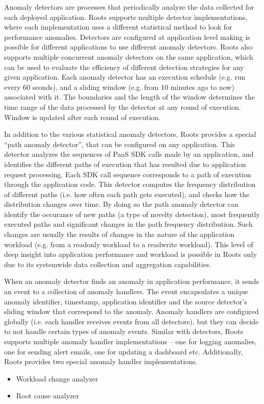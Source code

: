 Anomaly detectors are processes that periodically analyze the data collected for
each deployed application. Roots supports multiple detector implementations, where each implementation
uses a different statistical method to look for performance anomalies. Detectors are configured
at application level making is possible for different applications to use different anomaly 
detectors. Roots also supports multiple concurrent anomaly detectors on the same application, which can be used
to evaluate the efficiency of different detection strategies for any given application. Each
anomaly detector has an execution schedule (e.g. run every 60 seonds), and a sliding window 
(e.g. from 10 minutes ago to now)
associated with it. The boundaries and the length of the window determines the time range
of the data processed by the detector at any round of execution. Window is updated 
after each round of execution.

In addition to the various statistical anomaly detectors, Roots provides a special
``path anomaly detector'', that can be configured on any application. This detector
analyzes the sequences of PaaS SDK calls made by an application, and identifies the
different paths of execution that has resulted due to application request processing.
Each SDK call sequence corresponds to a path of execution through the application code.
This detector computes the frequency distribution of different paths (i.e. how often each path
gets executed), and checks how the distribution changes over time. By doing so the path anomaly
detector can identify the occurance of new paths (a type of novelty detection), most
frequently executed paths and
significant changes in the path frequency distribution. Such changes are usually
the results of changes in the nature of the application workload (e.g. from a readonly
workload to a readwrite workload). This level of deep insight into application
performance and workload is possible in Roots only due to its systemwide data
collection and aggregation capabilities.

When an anomaly detector finds an anomaly in application performance, it sends an event
to a collection of anomaly handlers. The event encapsulates a unique anomaly identifier, 
timestamp, application identifier and the source detector's sliding window that correspond to the
anomaly. Anomaly handlers are configured globally (i.e. each handler
receives events from all detectors), but they can decide to not handle certain types
of anomaly events. Similar with detectors, Roots supports multiple anomaly handler
implementations -- one for logging anomalies, one for sending alert emails, one
for updating a dashboard etc. Additionally, Roots provides two special anomaly handler
implementations.
\begin{itemize}
\item Workload change analyzer
\item Root cause analyzer
\end{itemize}

